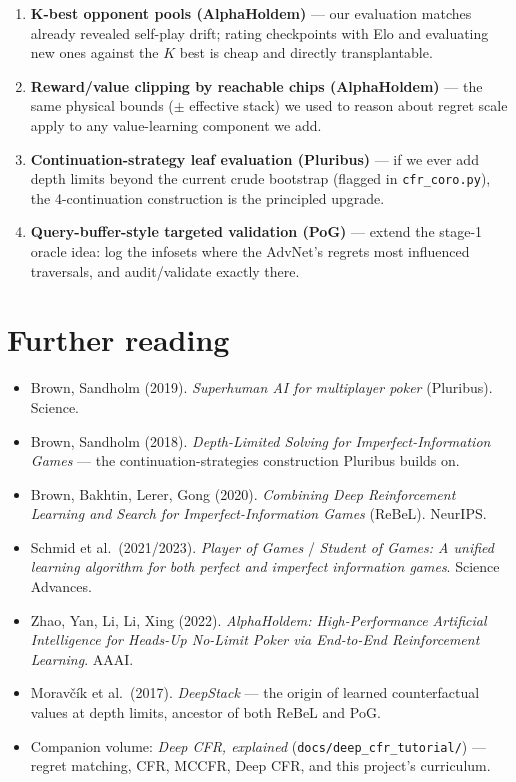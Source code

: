 \documentclass[11pt,a4paper]{article}
\begin{document}
\begin{enumerate}[leftmargin=1.6em, itemsep=2pt]
\item \textbf{K-best opponent pools (AlphaHoldem)} --- our evaluation matches
  already revealed self-play drift; rating checkpoints with Elo and evaluating
  new ones against the $K$ best is cheap and directly transplantable.
\item \textbf{Reward/value clipping by reachable chips (AlphaHoldem)} --- the
  same physical bounds ($\pm$ effective stack) we used to reason about regret
  scale apply to any value-learning component we add.
\item \textbf{Continuation-strategy leaf evaluation (Pluribus)} --- if we ever
  add depth limits beyond the current crude bootstrap (flagged in
  \texttt{cfr\_coro.py}), the 4-continuation construction is the principled
  upgrade.
\item \textbf{Query-buffer-style targeted validation (PoG)} --- extend the
  stage-1 oracle idea: log the infosets where the AdvNet's regrets most
  influenced traversals, and audit/validate exactly there.
\end{enumerate}

\section{Further reading}

\begin{itemize}[leftmargin=1.4em, itemsep=1pt]
\item Brown, Sandholm (2019). \emph{Superhuman AI for multiplayer poker}
  (Pluribus). Science.
\item Brown, Sandholm (2018). \emph{Depth-Limited Solving for
  Imperfect-Information Games} --- the continuation-strategies construction
  Pluribus builds on.
\item Brown, Bakhtin, Lerer, Gong (2020). \emph{Combining Deep Reinforcement
  Learning and Search for Imperfect-Information Games} (ReBeL). NeurIPS.
\item Schmid et al.\ (2021/2023). \emph{Player of Games} / \emph{Student of
  Games: A unified learning algorithm for both perfect and imperfect
  information games}. Science Advances.
\item Zhao, Yan, Li, Li, Xing (2022). \emph{AlphaHoldem: High-Performance
  Artificial Intelligence for Heads-Up No-Limit Poker via End-to-End
  Reinforcement Learning}. AAAI.
\item Morav\v{c}\'{i}k et al.\ (2017). \emph{DeepStack} --- the origin of
  learned counterfactual values at depth limits, ancestor of both ReBeL and
  PoG.
\item Companion volume: \emph{Deep CFR, explained}
  (\texttt{docs/deep\_cfr\_tutorial/}) --- regret matching, CFR, MCCFR,
  Deep CFR, and this project's curriculum.
\end{itemize}
\end{document}
